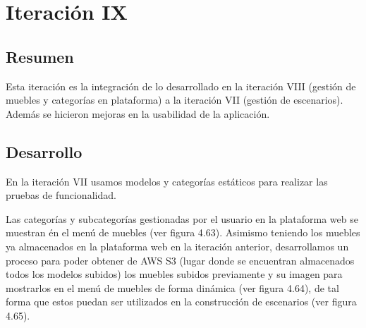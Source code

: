 \section{Iteración IX}
\subsection{Resumen}
Esta iteración es la integración de lo desarrollado en la iteración VIII (gestión de muebles y categorías en plataforma) a la iteración VII (gestión de escenarios). Además se hicieron mejoras en la usabilidad de la aplicación.

\subsection{Desarrollo}
En la iteración VII usamos modelos y categorías estáticos para realizar las pruebas de funcionalidad.\par
Las categorías y subcategorías gestionadas por el usuario en la plataforma web se muestran én el menú de muebles (ver figura 4.63). Asimismo teniendo los muebles ya almacenados en la plataforma web en la iteración anterior, desarrollamos un proceso para poder obtener de AWS S3 (lugar donde se encuentran almacenados todos los modelos subidos) los muebles subidos previamente y su imagen para mostrarlos en el menú de muebles de forma dinámica (ver figura 4.64), de tal forma que estos puedan ser utilizados en la construcción de escenarios (ver figura 4.65).


